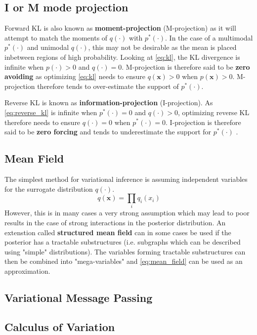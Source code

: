 \subsection{I or M mode projection}

Forward KL is also known as \textbf{moment-projection} (M-projection)  as it will attempt to match the moments of $q(\cdot)$ with $p^*(\cdot)$. In the case of a multimodal $p^*(\cdot)$ and unimodal $q(\cdot)$, this may not be desirable as the mean is placed inbetween regions of high probability. Looking at \cref{eq:kl}, the KL divergence is infinite when $p(\cdot) > 0$ and $q(\cdot) = 0$. M-projection is therefore said to be \textbf{zero avoiding} as optimizing \cref{eq:kl} needs to ensure $q(\mathbf{x}) > 0$ when $p(\mathbf{x}) > 0$. M-projection therefore tends to over-estimate the support of $p^*(\cdot)$.

Reverse KL is known as \textbf{information-projection} (I-projection). As \cref{eq:reverse_kl} is infinite when $p^*(\cdot) = 0$ and $q(\cdot) > 0$, optimizing reverse KL therefore needs to ensure $q(\cdot) = 0$ when $p^*(\cdot)=0$. I-projection is therefore said to be \textbf{zero forcing} and tends to underestimate the support for $p^*(\cdot)$ \cite{murphy}. 

\subsection{Mean Field}
The simplest method for variational inference is assuming independent variables for the surrogate distribution $q(\cdot)$. 
\begin{equation}\label{eq:mean_field}
    q(\mathbf{x}) = \prod_i q_i(x_i)
\end{equation}
However, this is in many cases a very strong assumption which may lead to poor results in the case of strong interactions in the posterior distribution. An extenstion called \textbf{structured mean field} can in some cases be used if the posterior has a tractable substructures (i.e. subgraphs which can be described using "simple" distributions). The variables forming tractable substructures can then be combined into "mega-variables" and \cref{eq:mean_field} can be used as an approximation.   

\subsection{Variational Message Passing}



\subsection{Calculus of Variation}